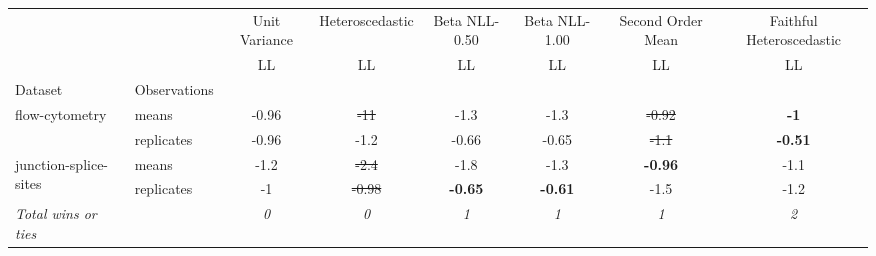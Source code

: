 \begin{tabular}{ll|c|c|c|c|c|c}
\toprule
{} & {} & {Unit Variance} & {Heteroscedastic} & {Beta NLL-0.50} & {Beta NLL-1.00} & {Second Order Mean} & {Faithful Heteroscedastic} \\
{} & {} & {LL} & {LL} & {LL} & {LL} & {LL} & {LL} \\
{Dataset} & {Observations} & {} & {} & {} & {} & {} & {} \\
\midrule
\multirow[c]{2}{*}{flow-cytometry} & means & -0.96 & \sout{-11} & -1.3 & -1.3 & \sout{-0.92} & \textbf{-1} \\
 & replicates & -0.96 & -1.2 & -0.66 & -0.65 & \sout{-1.1} & \textbf{-0.51} \\
\multirow[c]{2}{*}{junction-splice-sites} & means & -1.2 & \sout{-2.4} & -1.8 & -1.3 & \textbf{-0.96} & -1.1 \\
 & replicates & -1 & \sout{-0.98} & \textbf{-0.65} & \textbf{-0.61} & -1.5 & -1.2 \\
\textit{{Total wins or ties}} &  & \textit{0} & \textit{0} & \textit{1} & \textit{1} & \textit{1} & \textit{2} \\
\bottomrule
\end{tabular}
